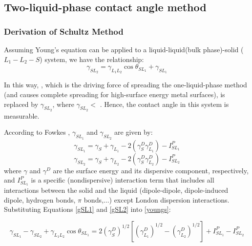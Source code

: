 \subsection{Two-liquid-phase contact angle method}
\subsubsection{Derivation of Schultz Method}
	
Assuming Young's equation can be applied to a liquid-liquid(bulk phase)-solid ($L_{1}-L_{2}-S$) system, we have the relationship:
\begin{equation}
\label{youngs}
	\gamma_{SL_{2}} = \gamma_{L_{1}L_{2}}\cos\theta_{SL_{1}} + \gamma_{SL_{1}}
\end{equation}

In this way, \gamSV, which is the driving force of spreading the one-liquid-phase method (and causes complete spreading for high-surface energy metal surfaces), is replaced by $ \gamma_{SL_{2}} $, where $\gamma_{SL_{2}} <$ \gamSV. Hence, the contact angle in this system is measurable. 



According to Fowkes \cite{Fowkes1964}, $\gamma_{SL_{1}}$ and $\gamma_{SL_{2}}$ are given by:
\begin{equation} 
\label{gSL1}
	\gamma_{SL_{1}} = \gamma_{S} + \gamma_{L_{1}} - 2(\gamma_{S}^{D}\gamma_{L_{1}}^{D}) - I_{SL_{1}}^{P}
\end{equation}
\begin{equation}
\label{gSL2}
	\gamma_{SL_{2}} = \gamma_{S} + \gamma_{L_{2}} - 2(\gamma_{S}^{D}\gamma_{L_{2}}^{D}) - I_{SL_{2}}^{P}
\end{equation} 
where $\gamma$ and $\gamma^{D}$ are the surface energy and its dispersive component, respectively, and $I_{SL_{1}}^{P}$ is a specific (nondispersive) interaction term that includes all interactions between the solid and the liquid (dipole-dipole, dipole-induced dipole, hydrogen bonds, $\pi$ bonds,...) except London dispersion interactions. 
Substituting Equations \ref{gSL1} and \ref{gSL2} into \ref{youngs}:

\begin{equation} 
\label{schultz1}
	\gamma_{SL_{1}}-\gamma_{SL_{2}}+\gamma_{L_{1}L_{2}}\cos\theta_{SL_{1}} = 2(\gamma_{S}^{D})^{1/2}  [(\gamma_{L_{1}}^{D})^{1/2}-(\gamma_{L_{2}}^{D})^{1/2}] + I_{SL_{1}}^{P} - I_{SL_{2}}^{P}
\end{equation}

